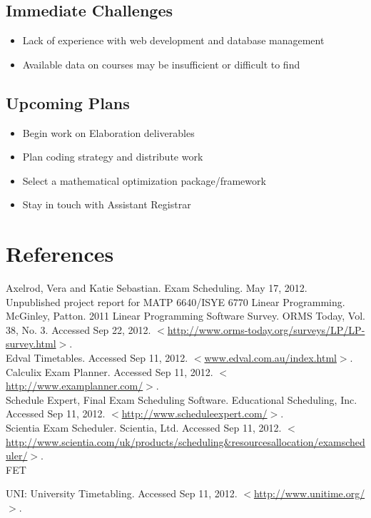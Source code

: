 \documentclass[11pt]{article}
\begin{document}
\subsection{Immediate Challenges} %
\begin{itemize}
\item Lack of experience with web development and database management
\item Available data on courses may be insufficient or difficult to find
\end{itemize}

\subsection{Upcoming Plans}
\begin{itemize}
\item Begin work on Elaboration deliverables
\item Plan coding strategy and distribute work
\item Select a mathematical optimization package/framework
\item Stay in touch with Assistant Registrar
\end{itemize}

\section*{References}

\hspace{0.25in}Axelrod, Vera and Katie Sebastian. Exam Scheduling. May 17, 2012. Unpublished project report for MATP 6640/ISYE 6770 Linear Programming. \\

McGinley,  Patton. 2011 Linear Programming Software Survey. ORMS Today, Vol. 38, No. 3.  Accessed Sep 22, 2012. $<$\url{http://www.orms-today.org/surveys/LP/LP-survey.html}$>$. \\

Edval Timetables. Accessed Sep 11, 2012. $<$\url{www.edval.com.au/index.html}$>$. \\

Calculix Exam Planner. Accessed Sep 11, 2012. $<$\url{http://www.examplanner.com/}$>$. \\

Schedule Expert, Final Exam Scheduling Software. Educational Scheduling, Inc. Accessed Sep 11, 2012. $<$\url{http://www.scheduleexpert.com/}$>$. \\


Scientia Exam Scheduler. Scientia, Ltd. Accessed Sep 11, 2012.
$<$\url{http://www.scientia.com/uk/products/scheduling&resourcesallocation/examscheduler/}$>$. \\

FET

UNI: University Timetabling. Accessed Sep 11, 2012.  $<$\url{http://www.unitime.org/}$>$.
\end{document}
